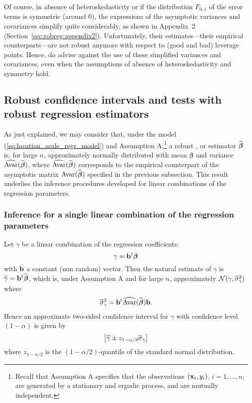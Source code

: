 Of course, in absence of heteroskedasticity or if the distribution $F_{0,1}$ of
the error terms is symmetric (around 0), the expressions of the asymptotic
variances and covariances simplify quite considerably, as shown in Appendix~2
(Section~\ref{sec:robreg:appendix2}). Unfortunately, their estimates---their
empirical counterparts---are not robust anymore with respect to (good and bad)
leverage points. Hence, \citet{Croux:2003} do advise against the use of these
simplified variances and covariances, even when the assumptions of absence of
heteroskedasticity and symmetry hold.

\subsection{Robust confidence intervals and tests with robust regression estimators}

As just explained, we may consider that, under the model
(\ref{eq:location_scale_regr_model}) and Assumption A,\footnote{Recall that
Assumption A specifies that the observations $(\mathbf x_i, y_i)$, $i = 1,
\dots, n$, are generated by a stationary and ergodic process, and are mutually
independent.} a robust ,  or  estimator
$\widehat{\boldsymbol\beta}$ is, for large $n$, approximately normally
distributed with mean $\boldsymbol\beta$ and variance
$\widehat{\mathrm{Avar}}(\widehat{\boldsymbol\beta})$, where
$\widehat{\mathrm{Avar}}(\widehat{\boldsymbol\beta})$ corresponds to the empirical
counterpart of the asymptotic matrix $\mathrm{Avar}(\widehat{\boldsymbol\beta})$
specified in the previous subsection. This result underlies the inference
procedures developed for linear combinations of the regression parameters.

\subsubsection{Inference for a single linear combination of the regression parameters}

Let $\gamma$ be a linear combination of the regression coefficients:
\[
    \gamma = \mathbf b^t \boldsymbol\beta
\]
with $\mathbf b$ a constant (non random) vector. Then the natural estimate of
$\gamma$ is $\widehat{\gamma} = \mathbf b^t\widehat{\boldsymbol\beta}$, which is,
under Assumption A and for large $n$, approximately $\mathcal{N}(\gamma,
\widehat{\sigma}_\gamma^2)$ where
\[
    \widehat{\sigma}_\gamma^2 = 
    \mathbf b^t \widehat{\mathrm{Avar}}(\widehat{\boldsymbol\beta}) \mathbf b.
\]
Hence an approximate two-sided confidence interval for $\gamma$ with
confidence level $(1- \alpha)$ is given by
\[
    \left[\sthat{\gamma} \pm z_{1-\alpha/2} \sthat{\sigma}_\gamma\right]
\]
where $z_{1-\alpha/2}$ is the $(1-\alpha/2)$-quantile of the standard normal 
distribution.

